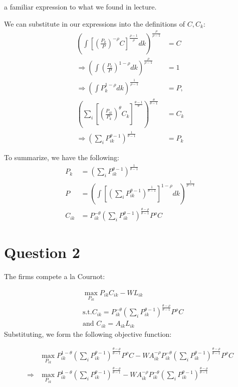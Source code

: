 \documentclass[11pt]{article} %
\begin{document}
a familiar expression to what we found in lecture.

We can substitute in our expressions into the definitions of $C,C_k$:
\begin{align*}
\left( \int \left[ \left( \frac{P_k}{P} \right)^{-\rho}C  \right]^{\frac{\rho - 1}{\rho}} dk \right)^{\frac{\rho}{\rho - 1}} &= C\\
\Rightarrow \left( \int  \left( \frac{P_k}{P} \right)^{1-\rho} dk \right)^{\frac{\rho}{\rho - 1}}  &= 1\\
\Rightarrow \left( \int  P_k^{1-\rho} dk \right)^{\frac{1}{\rho - 1}}  &= P, \\
\left( \sum_i \left[ \left( \frac{P_{ik}}{P_k} \right)^{\theta} C_k \right]^{\frac{\theta - 1}{\theta}}\right)^{\frac{\theta}{\theta - 1}} &= C_k \\
\Rightarrow \left( \sum_i P_{ik}^{\theta - 1} \right)^{\frac{1}{\theta - 1}} &= P_k
\end{align*}

To summarize, we have the following:
\begin{align}
P_k &=  \left( \sum_i P_{ik}^{\theta - 1} \right)^{\frac{1}{\theta - 1}}\\
P &=  \left( \int  \left[  \left( \sum_i P_{ik}^{\theta - 1} \right)^{\frac{1}{\theta - 1}} \right]^{1-\rho} dk \right)^{\frac{1}{\rho - 1}} \\
C_{ik} &= P_{ik}^{-\theta}\left( \sum_i P_{ik}^{\theta - 1}\right)^{\frac{ \theta-\rho}{\theta - 1}} P^{\rho} C
\end{align}

\section{Question 2}
The firms compete a la Cournot:

\begin{align*}
&\max_{P_{ik}} P_{ik}C_{ik} - WL_{ik}\\
&\text{s.t.} C_{ik} = P_{ik}^{-\theta}\left( \sum_i P_{ik}^{\theta - 1}\right)^{\frac{ \theta-\rho}{\theta - 1}} P^{\rho} C\\
&\text{and } C_{ik} = A_{ik}L_{ik}
\end{align*}
Substituting, we form the following objective function:

\begin{align*}
&\max_{P_{ik}}P_{ik}^{1-\theta}\left( \sum_i P_{ik}^{\theta - 1}\right)^{\frac{ \theta-\rho}{\theta - 1}} P^{\rho} C - WA_{ik}^{-\rho}P_{ik}^{-\theta}\left( \sum_i P_{ik}^{\theta - 1}\right)^{\frac{ \theta-\rho}{\theta - 1}} P^{\rho} C \\
\Rightarrow &\max_{P_{ik}}P_{ik}^{1-\theta}\left( \sum_i P_{ik}^{\theta - 1}\right)^{\frac{ \theta-\rho}{\theta - 1}}  - WA_{ik}^{-\rho}P_{ik}^{-\theta}\left( \sum_i P_{ik}^{\theta - 1}\right)^{\frac{ \theta-\rho}{\theta - 1}} 
\end{align*}
\end{document}
